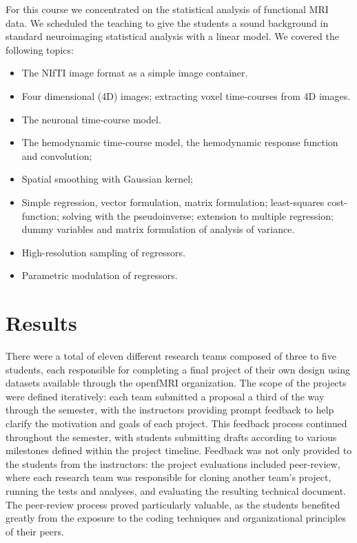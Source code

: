 For this course we concentrated on the statistical analysis of functional MRI
data.  We scheduled the teaching to give the students a sound background in
standard neuroimaging statistical analysis with a linear model.  We covered
the following topics:

\begin{itemize}

\item The NIfTI image format as a simple image container.
\item Four dimensional (4D) images; extracting voxel time-courses from 4D
    images.
\item The neuronal time-course model.
\item The hemodynamic time-course model, the hemodynamic response function and
    convolution;
\item Spatial smoothing with Gaussian kernel;
\item Simple regression, vector formulation, matrix formulation; least-squares
    cost-function; solving with the pseudoinverse; extension to multiple
        regression; dummy variables and matrix formulation of analysis of
        variance.
\item High-resolution sampling of regressors.
\item Parametric modulation of regressors.

\end{itemize}

\section{Results}\label{results}

There were a total of eleven different research teams composed of three
to five students, each responsible for completing a final project of their
own design using datasets available through the openfMRI organization.
The scope of the projects were defined iteratively: each team submitted a 
proposal a third of the way through the semester, with the instructors providing
prompt feedback to help clarify the motivation and goals of each project.
This feedback process continued throughout the semester, with students 
submitting drafts according to various milestones defined within the project
timeline.
Feedback was not only provided to the students from the instructors: the
project evaluations included peer-review, where each research team was
responsible for cloning another team's project, running the tests and analyses,
and evaluating the resulting technical document.
The peer-review process proved particularly valuable, as the students 
benefited greatly from the exposure to the coding techniques and 
organizational principles of their peers.

